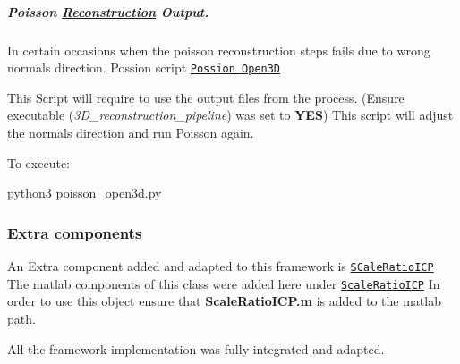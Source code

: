 \subparagraph*{Poisson \hyperlink{classReconstruction}{Reconstruction} Output.}

In certain occasions when the poisson reconstruction steps fails due to wrong normals direction. Possion script \href{https://github.com/esteban-andrade/3D-Reconstructrion-Scanner/blob/main/poisson_open3d.py}{\tt Possion Open3D}

This Script will require to use the output files from the process. (Ensure executable ({\itshape 3\+D\+\_\+reconstruction\+\_\+pipeline}) was set to {\bfseries Y\+ES}) This script will adjust the normals direction and run Poisson again.

To execute\+:


\begin{DoxyCode}
python3 poisson\_open3d.py
\end{DoxyCode}


\subsubsection*{Extra components}

An Extra component added and adapted to this framework is \href{https://github.com/linbaowei/ScaleRatioICP}{\tt S\+Cale\+Ratio\+I\+CP} The matlab components of this class were added here under \href{https://github.com/esteban-andrade/3D-Reconstructrion-Scanner}{\tt Scale\+Ratio\+I\+CP} In order to use this object ensure that {\bfseries Scale\+Ratio\+I\+C\+P.\+m} is added to the matlab path.

All the framework implementation was fully integrated and adapted. 